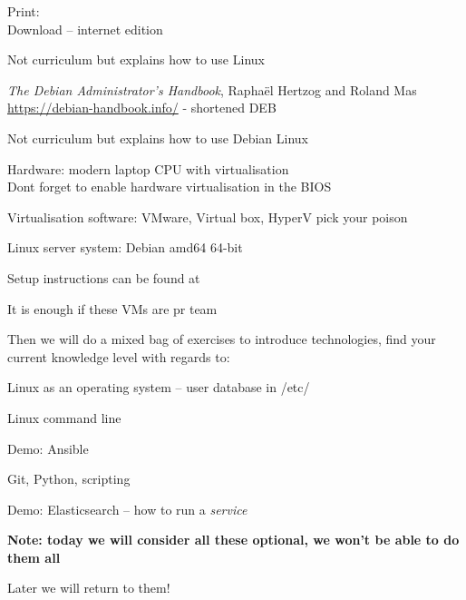 \documentclass[Screen16to9,17pt]{foils}
\begin{document}
Print: \\
Download -- internet edition 


Not curriculum but explains how to use Linux



\emph{The Debian Administrator’s Handbook}, Raphaël Hertzog and Roland Mas\\
\url{https://debian-handbook.info/} - shortened DEB

Not curriculum but explains how to use Debian Linux




\begin{list2}
\item Hardware: modern laptop CPU with virtualisation\\
Dont forget to enable hardware virtualisation in the BIOS
\item Virtualisation software: VMware, Virtual box, HyperV pick your poison
\item Linux server system: Debian amd64 64-bit 
\item Setup instructions can be found at 
\end{list2}

\centerline{It is enough if these VMs are pr team}


Then we will do a mixed bag of exercises to introduce technologies, find your current knowledge level with regards to:

\begin{list2}
\item Linux as an operating system -- user database in /etc/
\item Linux command line
\item Demo: Ansible
\item Git, Python, scripting
\item Demo: Elasticsearch -- how to run a \emph{service}
\end{list2}

{\bf Note: today we will consider all these optional, we won't be able to do them all}

Later we will return to them!
\end{document}
